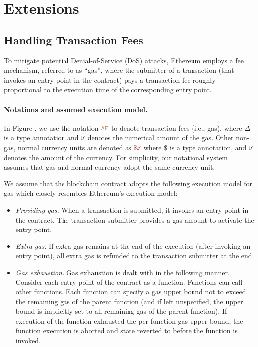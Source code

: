\section{Extensions}

\subsection{Handling Transaction Fees}

To mitigate potential Denial-of-Service (DoS) attacks, 
Ethereum employs a fee mechanism, referred to as ``gas'', 
where the submitter of a transaction (that invokes
an entry point in the contract) pays a  
transaction fee
roughly proportional to the execution time of the 
corresponding entry point.

\paragraph{Notations and assumed execution model.}
In Figure , we
use the notation $\tt {\color{brown} \Delta F }$
to denote transaction fees (i.e., gas), 
where $\Delta$ is a type annotation 
and ${\tt F}$ denotes the numerical amount of the  
gas. Other non-gas, normal currency units 
are denoted as $\smaroon{\$ F}$ where $\$$ is a type annotation,
and ${\tt F}$ denotes the amount of the currency. 
For simplicity, our notational system assumes 
that gas and normal currency adopt
the same currency unit. 

We assume that the blockchain contract adopts the following execution model
for gas which closely resembles Ethereum's execution model:
\begin{itemize}[leftmargin=5mm]
\item
{\it Providing gas.} 
When a transaction is submitted, it invokes an entry point in the contract.
The transaction submitter provides a gas amount to activate the entry point. 
\item
{\it Extra gas.} 
If extra gas remains at the end of the execution (after invoking an entry point),
all extra gas is refunded to the transaction submitter at the end.
\item
{\it Gas exhaustion.} 
Gas exhaustion is dealt with in the following manner.
Consider each entry point of the contract as a function. 
Functions can call other functions.
Each function can specify a gas upper bound not to exceed
the remaining gas of the parent function (and if left unspecified,
the upper bound is implicitly set to all remaining gas of the parent function).
If execution of the function exhausted the per-function gas 
upper bound, the function execution is aborted and 
state reverted to before the function is invoked.
\end{itemize}

